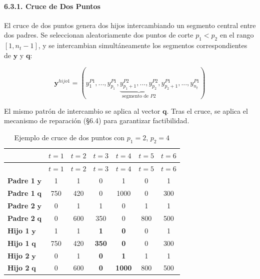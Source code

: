\documentclass[
  spanish,
  12pt,
]{article}
\begin{document}
\paragraph{6.3.1. Cruce de Dos Puntos}\label{cruce-de-dos-puntos}

El cruce de dos puntos genera dos hijos intercambiando un segmento
central entre dos padres. Se seleccionan aleatoriamente dos puntos de
corte \(p_1 < p_2\) en el rango \([1, n_t-1]\), y se intercambian
simultáneamente los segmentos correspondientes de \(\mathbf{y}\) y
\(\mathbf{q}\):

\begin{equation}
\mathbf{y}^{hijo1} = (y^{P1}_1, ..., y^{P1}_{p_1}, \underbrace{y^{P2}_{p_1+1}, ..., y^{P2}_{p_2}}_{\text{segmento de } P2}, y^{P1}_{p_2+1}, ..., y^{P1}_{n_t})
\end{equation}

El mismo patrón de intercambio se aplica al vector \(\mathbf{q}\). Tras
el cruce, se aplica el mecanismo de reparación (§6.4) para garantizar
factibilidad.

\begin{longtable}[]{@{}lcccccc@{}}
\caption{\label{tbl:tabla_5c}Ejemplo de cruce de dos puntos con
\(p_1 = 2\), \(p_2 = 4\)}\tabularnewline
\toprule\noalign{}
& \(t=1\) & \(t=2\) & \(t=3\) & \(t=4\) & \(t=5\) & \(t=6\) \\
\midrule\noalign{}
\endfirsthead
\toprule\noalign{}
& \(t=1\) & \(t=2\) & \(t=3\) & \(t=4\) & \(t=5\) & \(t=6\) \\
\midrule\noalign{}
\endhead
\bottomrule\noalign{}
\endlastfoot
\textbf{Padre 1} \(\mathbf{y}\) & 1 & 1 & 0 & 1 & 0 & 1 \\
\textbf{Padre 1} \(\mathbf{q}\) & 750 & 420 & 0 & 1000 & 0 & 300 \\
\textbf{Padre 2} \(\mathbf{y}\) & 0 & 1 & 1 & 0 & 1 & 1 \\
\textbf{Padre 2} \(\mathbf{q}\) & 0 & 600 & 350 & 0 & 800 & 500 \\
\textbf{Hijo 1} \(\mathbf{y}\) & 1 & 1 & \textbf{1} & \textbf{0} & 0 &
1 \\
\textbf{Hijo 1} \(\mathbf{q}\) & 750 & 420 & \textbf{350} & \textbf{0} &
0 & 300 \\
\textbf{Hijo 2} \(\mathbf{y}\) & 0 & 1 & \textbf{0} & \textbf{1} & 1 &
1 \\
\textbf{Hijo 2} \(\mathbf{q}\) & 0 & 600 & \textbf{0} & \textbf{1000} &
800 & 500 \\
\end{longtable}
\end{document}
